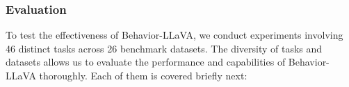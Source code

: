 \subsubsection{Evaluation}

To test the effectiveness of Behavior-LLaVA, we conduct experiments involving 46 distinct tasks across 26 benchmark datasets. The diversity of tasks and datasets allows us to evaluate the performance and capabilities of Behavior-LLaVA thoroughly. Each of them is covered briefly next:










